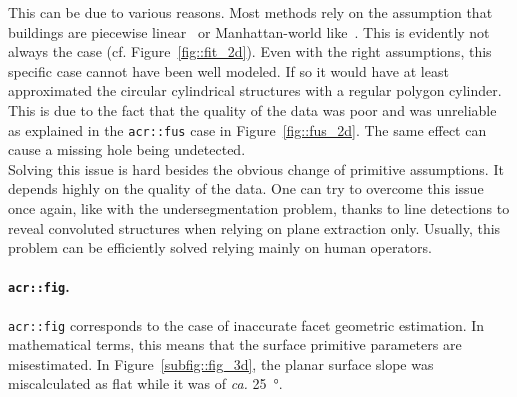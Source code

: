                 This can be due to various reasons.
                Most methods rely on the assumption that buildings are piecewise linear~\parencite{nan2017polyfit} or Manhattan-world like~\parencite{li2016manhattan}.
                This is evidently not always the case (cf. Figure~\ref{fig::fit_2d}).
                Even with the right assumptions, this specific case cannot have been well modeled.
                If so it would have at least approximated the circular cylindrical structures with a regular polygon cylinder.
                This is due to the fact that the quality of the data was poor and was unreliable as explained in the \texttt{\gls{acr::fus}} case in Figure~\ref{fig::fus_2d}.
                The same effect can cause a missing hole being undetected.\\

                Solving this issue is hard besides the obvious change of primitive assumptions.
                It depends highly on the quality of the data.
                One can try to overcome this issue once again, like with the undersegmentation problem, thanks to line detections to reveal convoluted structures when relying on plane extraction only.
                Usually, this problem can be efficiently solved relying mainly on human operators.

            \paragraph{\texttt{\acrlong*{acr::fig}}.}
                \texttt{\gls{acr::fig}} corresponds to the case of inaccurate facet geometric estimation.
                In mathematical terms, this means that the surface primitive parameters are misestimated.
                In Figure~\ref{subfig::fig_3d}, the planar surface slope was miscalculated as flat while it was of \textit{ca.} \SI{25}{\degree}.\\

